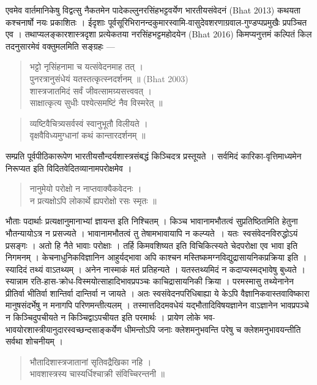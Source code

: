 {\dev एवमेव वार्तमानिकेषु विद्वत्सु नैकतमेन पादेकल्लुनरसिंहभट्टवर्येण भारतीयसंवेदनं (Bhat 2013) कथयता कश्चनार्षो नयः प्रकाशितः । ईदृशाः पूर्वसूरिभिरानन्दकुमारस्वामि-वासुदेवशरणाग्रवाल-गुण्डप्पप्रमुखैः प्रपञ्चित एव । तथाप्यलङ्कारशास्त्रदृशा प्रत्येकतया नरसिंहभट्टमहोदयेन (Bhat 2016) किमप्यनुत्तमं कल्पितं किल तदनुसारमेवं वक्तुमलमिति सङ्ग्रहः ---}
\begin{quote}
{\dev भट्टो नृसिंहनामा च यत्संवेदनमाह तत् ।}\\
{\dev पुनरत्रानुसंधेयं यतस्तत्कृत्स्नदर्शनम् ॥} (Bhat 2003)\\ 
{\dev शास्त्रजातमिदं सर्वं जीवत्सामग्र्यसत्त्ववत् ।}\\
{\dev साक्षात्कृत्य सुधीः पश्येत्समष्टिं नैव विस्मरेत् ॥}  
\end{quote}
\begin{quote}
{\dev व्यष्टिवैचित्र्यसर्वस्वं स्वानुभूतौ विलीयते ।}\\
{\dev वृक्षवैविध्यमुग्धानां कथं कान्तारदर्शनम् ॥}
\end{quote}

{\dev सम्प्रति पूर्वपीठिकारूपेण भारतीयसौन्दर्यशास्त्रसंबद्धं किञ्चिदत्र प्रस्तूयते । सर्वमिदं कारिका-वृत्तिमाध्यमेन निरूप्यत इति विदितवेदितव्यानामपरोक्षमेव ।}
\begin{quote}
{\dev नानुमेयो परोक्षो न नाप्तवाक्यैकवेदनः ।}\\
{\dev न प्रत्यक्षोऽपि लोकार्थे ह्यपरोक्षो रसः स्मृतः ॥}
\end{quote}

{\dev भौताः पदार्थाः प्रत्यक्षानुमानाभ्यां ज्ञायन्त इति निश्चितम् । किञ्च भावानामभौतत्वं सुप्रतिष्ठित\-मिति हेतुना भौतन्यायोऽत्र न प्रसज्यते । भावानामभौतत्वं तु तेषामभावायापि न कल्प्यते~। यतः\ स्वसंवेदनविरुद्धोऽयं प्रसङ्गः । अतो हि नैते भावाः परोक्षाः । तर्हि किमवशिष्यत इति विचिकित्स्यते चेदपरोक्षा एव भावा इति  निगमनम् । केचनाधुनिकविज्ञानिन आहुर्यद्भावा अपि काश्चन मस्तिष्कमग्नविद्युद्रासायनिकप्रक्रिया इति । स्यादिदं तथ्यं वाऽतथ्यम् । अनेन नास्माकं मतं प्रतिहन्यते । यतस्तथ्यमिदं न कदाप्यस्मद्भावेषु बुध्यते । स्यान्नाम रति-हास-क्रोध-विस्मयोत्साहादिभावप्रपञ्चः काचिद्रासायनिकी क्रिया । परमस्मासु तथ्येनानेन प्रीतिर्वा भीतिर्वा शान्तिर्वा दान्तिर्वा न जायते । अतः स्वसंवेदनपरिधिबाह्या ये केऽपि वैज्ञानिकवास्तवाविष्कारा मानुषसंदर्भेषु न मनागपि परिणमन्तीत्यलम् । तस्मात्तदिदमवधेयं यद्भौतादिविषयज्ञानेन वाऽज्ञानेन भावप्रपञ्चे न किञ्चिदुपचीयते न किञ्चिद्वाऽपचीयत इति परमार्थः । प्रायेण लोके भव-भावयोरशास्त्रीयानुदारस्वच्छन्दसाङ्कर्येण धीमन्तोऽपि जनाः क्लेशमनुभवन्ति परेषु च क्लेशमनुभावयन्तीति सर्वथा शोचनीयम् ।}
\begin{quote}
{\dev भौतादिशास्त्रजातानां सृतिवद्रैखिका नहि ।}\\
{\dev भावशास्त्रस्य चास्यर्धिश्चाक्री संविच्चिरन्तनी ॥}
\end{quote}

